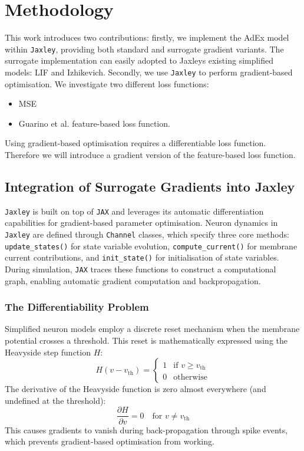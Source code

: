 \documentclass[conference]{IEEEtran}
\begin{document}
\section{Methodology}\label{sec:method}
This work introduces two contributions: firstly, we implement the \ac{AdEx} model within \texttt{Jaxley}, providing both standard and surrogate gradient variants.
The surrogate implementation can easily adopted to Jaxleys existing simplified models: \ac{LIF} and Izhikevich.
Secondly, we use \texttt{Jaxley} to perform gradient-based optimisation.
We investigate two different loss functions:
\begin{itemize}
  \item \ac{MSE}
  \item Guarino et al. \cite{Guarino2025} feature-based loss function.
\end{itemize}
Using gradient-based optimisation requires a differentiable loss function.
Therefore we will introduce a gradient version of the feature-based loss function.

\subsection{Integration of Surrogate Gradients into Jaxley}
\texttt{Jaxley} is built on top of \texttt{JAX} and leverages its automatic differentiation capabilities for gradient-based parameter optimisation.
Neuron dynamics in \texttt{Jaxley} are defined through \texttt{Channel} classes, which specify three core methods: \texttt{update\_states()} for state variable evolution, \texttt{compute\_current()} for membrane current contributions, and \texttt{init\_state()} for initialisation of state variables.
During simulation, \texttt{JAX} traces these functions to construct a computational graph, enabling automatic gradient computation and backpropagation.

\subsubsection{The Differentiability Problem}
Simplified neuron models employ a discrete reset mechanism when the membrane potential crosses a threshold.
This reset is mathematically expressed using the Heavyside step function $H$:
\begin{equation}
    H(v - v_{\text{th}}) = \begin{cases} 1 & \text{if } v \geq v_{\text{th}} \\ 0 & \text{otherwise} \end{cases}
\end{equation}
The derivative of the Heavyside function is zero almost everywhere (and undefined at the threshold):
\begin{equation}
    \frac{\partial H}{\partial v} = 0 \quad \text{for } v \neq v_{\text{th}}
\end{equation}
This causes gradients to vanish during back-propagation through spike events, which prevents gradient-based optimisation from working.
\end{document}

